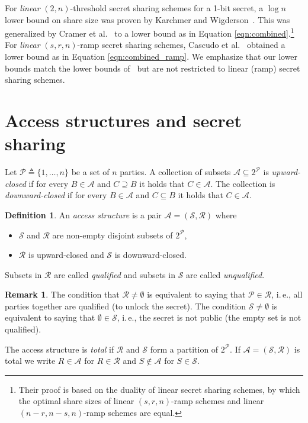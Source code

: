 \documentclass[11pt]{article}
\numberwithin{equation}{section}
\theoremstyle{definition}
\newtheorem{definition}[theorem]{Definition}
\newtheorem{remark}[theorem]{Remark}
\theoremstyle{plain}
\newcommand{\ie}{i.\,e.}
\newcommand{\parties}{\mathcal P}
\def\calA{\mathcal{A}}
\def\calS{\mathcal{S}}
\def\calR{\mathcal{R}}
\begin{document}
For \emph{linear} $(2,n)$-threshold secret sharing schemes for a 1-bit secret, a
$\log n$ lower bound on share size was proven by Karchmer and
Wigderson~\cite{KarchmerW93}. This was generalized by Cramer et al.~\cite{CramerF02} to a lower bound as in Equation \eqref{eqn:combined}.\footnote{Their proof is based on the duality of linear secret sharing schemes, by which the optimal share sizes of linear $(s, r, n)$-ramp schemes and linear $(n-r, n-s, n)$-ramp schemes are equal.}
For \emph{linear} $(s,r,n)$-ramp secret sharing schemes, 
Cascudo et al.~\cite{PueyoCX13} obtained a
lower bound as in Equation \eqref{eqn:combined_ramp}. We emphasize that our
lower bounds match the lower bounds of~\cite{PueyoCX13} but are not restricted
to linear (ramp) secret sharing schemes.


\section{Access structures and secret sharing}
\label{sec:prelim}

%
Let $\parties \triangleq \{1,\dots,n\}$ be a set of $n$ parties. A
collection of subsets $\calA\subseteq 2^\parties$ is \emph{upward-closed} 
if for every $B\in \calA$ and $C\supseteq B$ it holds that $C\in
\calA$.  The collection is \emph{downward-closed} if for every 
$B\in \calA$ and $C \subseteq B$ it holds that $C\in \calA$.

\begin{definition}   \label{def:accessstructure}
%
An \emph{access structure} is a pair $\calA = (\calS, \calR)$
where
\begin{itemize}
\item[(i)] $\calS$ and $\calR$ are non-empty disjoint subsets of $2^\parties$,
\item[(ii)] $\calR$ is upward-closed and $\calS$ is downward-closed.
\end{itemize}  
Subsets in $\calR$ are called \emph{qualified} and subsets
in $\calS$ are called \emph{unqualified}.
\end{definition}
\begin{remark}    \label{rem:closed}
The condition that $\calR\neq\emptyset$
is equivalent to saying that $\parties\in\calR$, \ie,
all parties together are qualified (to unlock the
secret).  The condition $\calS\neq\emptyset$ 
is equivalent to saying that $\emptyset\in\calS$, \ie,
the secret is not public (the empty set is
not qualified).
\end{remark}  

The access structure is \emph{total} if $\calR$ and $\calS$ form a partition of
$2^{\parties}$.  If $\calA = (\calS, \calR)$ is total we write $R \in \calA$ for
$R \in \calR$ and $S \not\in \calA$ for $S \in \calS$.
\end{document}
